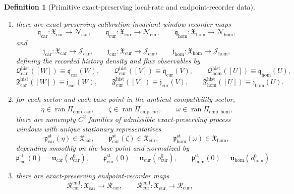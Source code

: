 \documentclass[11pt]{article}
\newcommand{\TensorDensityClass}{\mathscr N_{\mathrm{car}}}
\newcommand{\CurDensityClass}{\mathscr N_{\mathrm{cur}}}
\newcommand{\HomDensityClass}{\mathscr N_{\mathrm{hom}}}
\newcommand{\TensorEqCmpProj}{\widetilde\Pi_{\mathrm{cmp,car}}}
\newcommand{\CurEqCmpProj}{\widetilde\Pi_{\mathrm{cmp,cur}}}
\newcommand{\HomEqCmpProj}{\widetilde\Pi_{\mathrm{cmp,hom}}}
\newcommand{\TensorFluxClass}{\mathscr J_{\mathrm{car}}}
\newcommand{\CurFluxClass}{\mathscr J_{\mathrm{cur}}}
\newcommand{\HomFluxClass}{\mathscr J_{\mathrm{hom}}}
\newcommand{\TensorObjBase}{o_{\mathrm{car}}^0}
\newcommand{\CurObjBase}{o_{\mathrm{cur}}^0}
\newcommand{\HomObjBase}{o_{\mathrm{hom}}^0}
\newcommand{\TensorPhaseReadClass}{\mathscr R_{\mathrm{car}}}
\newcommand{\CurPhaseReadClass}{\mathscr R_{\mathrm{cur}}}
\newcommand{\TensorWindowClass}{\mathfrak X_{\mathrm{car}}}
\newcommand{\CurWindowClass}{\mathfrak X_{\mathrm{cur}}}
\newcommand{\HomWindowClass}{\mathfrak X_{\mathrm{hom}}}
\newcommand{\TensorWindowDensity}{\mathfrak q_{\mathrm{car}}}
\newcommand{\CurWindowDensity}{\mathfrak q_{\mathrm{cur}}}
\newcommand{\HomWindowDensity}{\mathfrak q_{\mathrm{hom}}}
\newcommand{\TensorWindowFlux}{\mathfrak j_{\mathrm{car}}}
\newcommand{\CurWindowFlux}{\mathfrak j_{\mathrm{cur}}}
\newcommand{\HomWindowFlux}{\mathfrak j_{\mathrm{hom}}}
\newcommand{\TensorEndpointReadSeed}{\mathscr R_{\mathrm{car}}^{\mathrm{end}}}
\newcommand{\CurEndpointReadSeed}{\mathscr R_{\mathrm{cur}}^{\mathrm{end}}}
\newcommand{\TensorStationaryWindow}{\mathfrak p_{\mathrm{car}}^{\mathrm{st}}}
\newcommand{\CurStationaryWindow}{\mathfrak p_{\mathrm{cur}}^{\mathrm{st}}}
\newcommand{\HomStationaryWindow}{\mathfrak p_{\mathrm{hom}}^{\mathrm{st}}}
\newtheorem{definition}{Definition}
\begin{document}
\begin{definition}[Primitive exact-preserving local-rate and endpoint-recorder data]
\begin{enumerate}
\begin{equation}
    \label{eq:history_action_from_rate}
    \end{equation}
    \item there are exact-preserving calibration-invariant window recorder maps
    \[
    \TensorWindowDensity:\TensorWindowClass\to\TensorDensityClass,\qquad
    \CurWindowDensity:\CurWindowClass\to\CurDensityClass,\qquad
    \HomWindowDensity:\HomWindowClass\to\HomDensityClass,
    \]
    and
    \[
    \TensorWindowFlux:\TensorWindowClass\to\TensorFluxClass,\qquad
    \CurWindowFlux:\CurWindowClass\to\CurFluxClass,\qquad
    \HomWindowFlux:\HomWindowClass\to\HomFluxClass,
    \]
    defining the recorded history density and flux observables by
    \begin{equation}
    \mathcal Q_{\mathrm{car}}^{\mathrm{hist}}([W])\equiv\TensorWindowDensity(W),\qquad
    \mathcal Q_{\mathrm{cur}}^{\mathrm{hist}}([V])\equiv\CurWindowDensity(V),\qquad
    \mathcal Q_{\mathrm{hom}}^{\mathrm{hist}}([U])\equiv\HomWindowDensity(U),
    \label{eq:history_density_from_windows}
    \end{equation}
    \begin{equation}
    \mathfrak F_{\mathrm{car}}^{\mathrm{hist}}([W])\equiv\TensorWindowFlux(W),\qquad
    \mathfrak F_{\mathrm{cur}}^{\mathrm{hist}}([V])\equiv\CurWindowFlux(V),\qquad
    \mathfrak F_{\mathrm{hom}}^{\mathrm{hist}}([U])\equiv\HomWindowFlux(U).
    \label{eq:history_flux_from_windows}
    \end{equation}
    \item for each sector and each base point in the ambient compatibility sector,
    \[
    \eta\in\operatorname{ran}\TensorEqCmpProj,\qquad
    \zeta\in\operatorname{ran}\CurEqCmpProj,\qquad
    \omega\in\operatorname{ran}\HomEqCmpProj,
    \]
    there are nonempty \(C^2\) families of admissible exact-preserving process windows with unique stationary representatives
    \[
    \TensorStationaryWindow(\eta)\in\TensorWindowClass,\qquad
    \CurStationaryWindow(\zeta)\in\CurWindowClass,\qquad
    \HomStationaryWindow(\omega)\in\HomWindowClass,
    \]
    depending smoothly on the base point and normalized by
    \[
    \TensorStationaryWindow(0)=\mathbf u_{\mathrm{car}}(\TensorObjBase),\qquad
    \CurStationaryWindow(0)=\mathbf u_{\mathrm{cur}}(\CurObjBase),\qquad
    \HomStationaryWindow(0)=\mathbf u_{\mathrm{hom}}(\HomObjBase).
    \]
    \item there are exact-preserving endpoint-recorder maps
    \[
    \TensorEndpointReadSeed:\TensorWindowClass\to\TensorPhaseReadClass,\qquad
    \CurEndpointReadSeed:\CurWindowClass\to\CurPhaseReadClass,\qquad
\]
\end{enumerate}
\end{definition}
\end{document}
